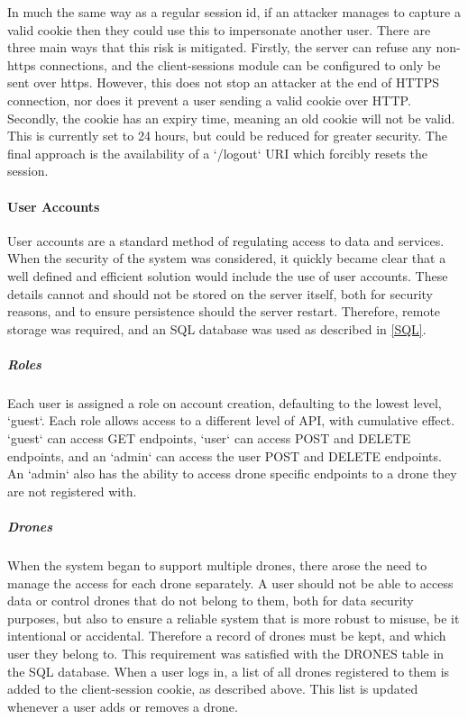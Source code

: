 \documentclass{article}
\begin{document}
In much the same way as a regular session id, if an attacker manages to capture a valid cookie then they could use this to impersonate another user. There are three main ways that this risk is mitigated. Firstly, the server can refuse any non-https connections, and the client-sessions module can be configured to only be sent over https. However, this does not stop an attacker at the end of HTTPS connection, nor does it prevent a user sending a valid cookie over HTTP. Secondly, the cookie has an expiry time, meaning an old cookie will not be valid. This is currently set to 24 hours, but could be reduced for greater security\cite{mozillaClientSessions}. The final approach is the availability of a `/logout` URI which forcibly resets the session. 


\paragraph{User Accounts}
User accounts are a standard method of regulating access to data and services. When the security of the system was considered, it quickly became clear that a well defined and efficient solution would include the use of user accounts. These details cannot and should not be stored on the server itself, both for security reasons, and to ensure persistence should the server restart. Therefore, remote storage was required, and an SQL database was used as described in \ref{SQL}.

\subparagraph{Roles}
Each user is assigned a role on account creation, defaulting to the lowest level, `guest`. Each role allows access to a different level of API, with cumulative effect. `guest` can access GET endpoints, `user` can access POST and DELETE endpoints, and an `admin` can access the user POST and DELETE endpoints. An `admin` also has the ability to access drone specific endpoints to a drone they are not registered with. 

\subparagraph{Drones}
When the system began to support multiple drones, there arose the need to manage the access for each drone separately. A user should not be able to access data or control drones that do not belong to them, both for data security purposes, but also to ensure a reliable system that is more robust to misuse, be it intentional or accidental. Therefore a record of drones must be kept, and which user they belong to. This requirement was satisfied with the DRONES table in the SQL database. When a user logs in, a list of all drones registered to them is added to the client-session cookie, as described above. This list is updated whenever a user adds or removes a drone. 
\end{document}
